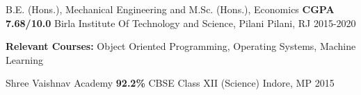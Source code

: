 \begin{cventries}
  \cventry
    {B.E. (Hons.), Mechanical Engineering and M.Sc. (Hons.), Economics \textbar \textbf{CGPA 7.68/10.0}}
    {Birla Institute Of Technology and Science, Pilani}
    {Pilani, RJ}
    {2015-2020}
    {
      \begin{cvitems}
        \item {\textbf{Relevant Courses:} Object Oriented Programming, Operating Systems, Machine Learning}
      \end{cvitems}
    }
  \cventry
    {Shree Vaishnav Academy \textbar \textbf{92.2\%}}
    {CBSE Class XII (Science)}
    {Indore, MP}
    {2015}
    {}
\end{cventries}
